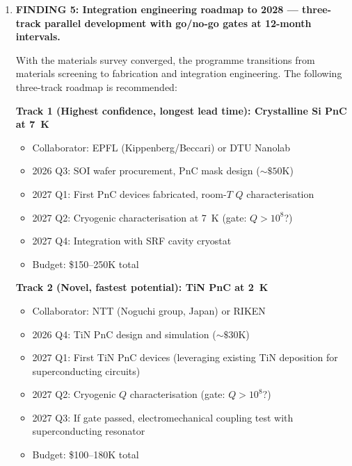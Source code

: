 \documentclass[11pt]{article}
\theoremstyle{definition}
\theoremstyle{remark}
\newcommand{\ee}[1]{\times 10^{#1}}
\newcommand{\Qpsi}{Q_\psi}
\newcommand{\confirmed}[1]{\textcolor{blue}{\textbf{CONFIRMED:} #1}}
\begin{document}
\begin{tcolorbox}[colback=blue!5!white, colframe=blue!50!black,
  title=\textbf{W4i15 TOP 5 FINDINGS --- Ranked by Programme Impact}]
\begin{enumerate}
\textbf{Quantitative gap estimate:} The best demonstrated
soft-clamped PnC in Si$_3$N$_4$ achieves $D_Q \sim 10^4$
(Tsaturyan et al., 2017). Applying this to crystalline Si with
$Q_{\rm int} \sim 10^6$ at 7~K: $Q_{\rm Si,\,PnC} \sim 10^{10}$.
In practice, reduced dilution factor in 2D vs 1D geometries
may limit this to $Q \sim 10^8$--$10^{10}$, but the lower end
($10^8$) already satisfies $Q > \Qpsi = 2.2\ee{8}$.

\confirmed{The crystalline Si material ceiling ($Q > 10^{10}$ at
7~K) is not a barrier. The DFD-relevant question is: can
$D_Q > 10^2$ be achieved in a 2D PnC geometry on a strained
crystalline Si membrane with $M_{\rm eff} > 10^{-10}$~kg?
If yes, $Q > 10^8$ is guaranteed. This is an engineering problem,
not a materials science problem.}

\item \textbf{FINDING 5: Integration engineering roadmap to
2028 --- three-track parallel development with go/no-go gates
at 12-month intervals.}

With the materials survey converged, the programme transitions
from materials screening to fabrication and integration
engineering. The following three-track roadmap is recommended:

\textbf{Track 1 (Highest confidence, longest lead time):
Crystalline Si PnC at 7~K}
\begin{itemize}[nosep]
\item Collaborator: EPFL (Kippenberg/Beccari) or DTU Nanolab
\item 2026 Q3: SOI wafer procurement, PnC mask design
  ($\sim \$50$K)
\item 2027 Q1: First PnC devices fabricated, room-$T$ $Q$
  characterisation
\item 2027 Q2: Cryogenic characterisation at 7~K
  (gate: $Q > 10^8$?)
\item 2027 Q4: Integration with SRF cavity cryostat
\item Budget: \$150--250K total
\end{itemize}

\textbf{Track 2 (Novel, fastest potential):
TiN PnC at 2~K}
\begin{itemize}[nosep]
\item Collaborator: NTT (Noguchi group, Japan) or RIKEN
\item 2026 Q4: TiN PnC design and simulation ($\sim \$30$K)
\item 2027 Q1: First TiN PnC devices (leveraging existing TiN
  deposition for superconducting circuits)
\item 2027 Q2: Cryogenic $Q$ characterisation
  (gate: $Q > 10^8$?)
\item 2027 Q3: If gate passed, electromechanical coupling test
  with superconducting resonator
\item Budget: \$100--180K total
\end{itemize}


\end{enumerate}
\end{tcolorbox}
\end{document}

